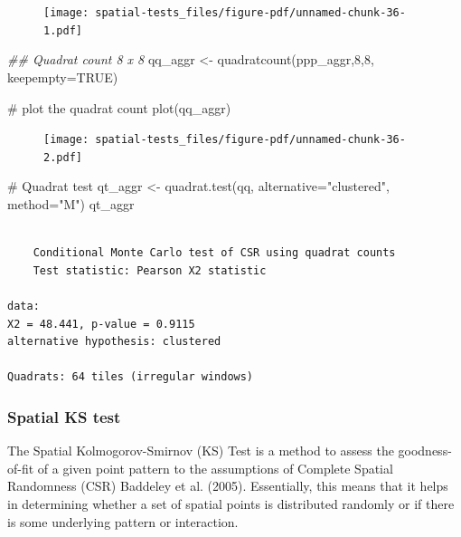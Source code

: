 \documentclass[
  letterpaper,
]{book}
\newenvironment{Shaded}{\begin{snugshade}}{\end{snugshade}}
\newcommand{\AttributeTok}[1]{\textcolor[rgb]{0.40,0.45,0.13}{#1}}
\newcommand{\CommentTok}[1]{\textcolor[rgb]{0.37,0.37,0.37}{#1}}
\newcommand{\ConstantTok}[1]{\textcolor[rgb]{0.56,0.35,0.01}{#1}}
\newcommand{\DecValTok}[1]{\textcolor[rgb]{0.68,0.00,0.00}{#1}}
\newcommand{\DocumentationTok}[1]{\textcolor[rgb]{0.37,0.37,0.37}{\textit{#1}}}
\newcommand{\FunctionTok}[1]{\textcolor[rgb]{0.28,0.35,0.67}{#1}}
\newcommand{\NormalTok}[1]{\textcolor[rgb]{0.00,0.23,0.31}{#1}}
\newcommand{\OtherTok}[1]{\textcolor[rgb]{0.00,0.23,0.31}{#1}}
\newcommand{\StringTok}[1]{\textcolor[rgb]{0.13,0.47,0.30}{#1}}
\begin{document}
\begin{figure}[H]

\texttt{[image: spatial-tests\_files/figure-pdf/unnamed-chunk-36-1.pdf]} \hfill{}

\end{figure}

\begin{Shaded}
\begin{Highlighting}[]
\DocumentationTok{\#\# Quadrat count 8 x 8}
\NormalTok{qq\_aggr }\OtherTok{\textless{}{-}} \FunctionTok{quadratcount}\NormalTok{(ppp\_aggr,}\DecValTok{8}\NormalTok{,}\DecValTok{8}\NormalTok{, }\AttributeTok{keepempty=}\ConstantTok{TRUE}\NormalTok{) }

\CommentTok{\# plot the quadrat count}
\FunctionTok{plot}\NormalTok{(qq\_aggr)}
\end{Highlighting}
\end{Shaded}

\begin{figure}[H]

\texttt{[image: spatial-tests\_files/figure-pdf/unnamed-chunk-36-2.pdf]} \hfill{}

\end{figure}

\begin{Shaded}
\begin{Highlighting}[]
\CommentTok{\# Quadrat test}
\NormalTok{qt\_aggr }\OtherTok{\textless{}{-}} \FunctionTok{quadrat.test}\NormalTok{(qq, }\AttributeTok{alternative=}\StringTok{"clustered"}\NormalTok{, }\AttributeTok{method=}\StringTok{"M"}\NormalTok{)}
\NormalTok{qt\_aggr}
\end{Highlighting}
\end{Shaded}

\begin{verbatim}

    Conditional Monte Carlo test of CSR using quadrat counts
    Test statistic: Pearson X2 statistic

data:  
X2 = 48.441, p-value = 0.9115
alternative hypothesis: clustered

Quadrats: 64 tiles (irregular windows)
\end{verbatim}

\hypertarget{spatial-ks-test}{%
\subsubsection{Spatial KS test}\label{spatial-ks-test}}

The Spatial Kolmogorov-Smirnov (KS) Test is a method to assess the
goodness-of-fit of a given point pattern to the assumptions of Complete
Spatial Randomness (CSR) Baddeley et al. (2005). Essentially, this means
that it helps in determining whether a set of spatial points is
distributed randomly or if there is some underlying pattern or
interaction.
\end{document}
